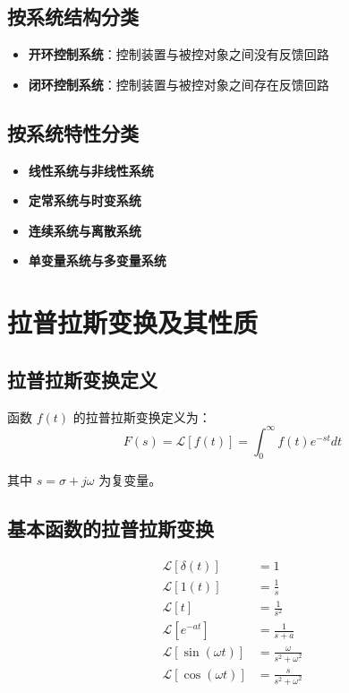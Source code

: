 \documentclass[12pt,a4paper]{article}
\newcommand{\laplace}{\mathcal{L}}
\begin{document}
\subsection{按系统结构分类}
\begin{itemize}
    \item \textbf{开环控制系统}：控制装置与被控对象之间没有反馈回路
    \item \textbf{闭环控制系统}：控制装置与被控对象之间存在反馈回路
\end{itemize}

\subsection{按系统特性分类}
\begin{itemize}
    \item \textbf{线性系统与非线性系统}
    \item \textbf{定常系统与时变系统}
    \item \textbf{连续系统与离散系统}
    \item \textbf{单变量系统与多变量系统}
\end{itemize}

\section{拉普拉斯变换及其性质}

\subsection{拉普拉斯变换定义}
函数 $f(t)$ 的拉普拉斯变换定义为：
\[F(s) = \laplace[f(t)] = \int_0^{\infty} f(t)e^{-st} dt\]

其中 $s = \sigma + j\omega$ 为复变量。

\subsection{基本函数的拉普拉斯变换}
\begin{align}
\laplace[\delta(t)] &= 1 \\
\laplace[1(t)] &= \frac{1}{s} \\
\laplace[t] &= \frac{1}{s^2} \\
\laplace[e^{-at}] &= \frac{1}{s+a} \\
\laplace[\sin(\omega t)] &= \frac{\omega}{s^2+\omega^2} \\
\laplace[\cos(\omega t)] &= \frac{s}{s^2+\omega^2}
\end{align}
\end{document}
